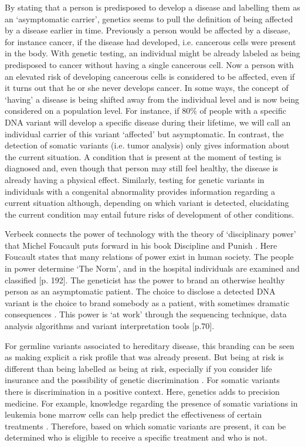 By stating that a person is predisposed to develop a disease and labelling them as an ‘asymptomatic carrier’, genetics seems to pull the definition of being affected by a disease earlier in time. 
Previously a person would be affected by a disease, for instance cancer, if the disease had developed, i.e. cancerous cells were present in the body. 
With genetic testing, an individual might be already labeled as being predisposed to cancer without having a single cancerous cell. 
Now a person with an elevated risk of developing cancerous cells is considered to be affected, even if it turns out that he or she never develops cancer. In some ways, the concept of ‘having’ a disease is being shifted away from the individual level and is now being considered on a population level. 
For instance, if 80\% of people with a specific DNA variant will develop a specific disease during their lifetime, we will call an individual carrier of this variant ‘affected’ but asymptomatic. 
In contrast, the detection of somatic variants (i.e. tumor analysis) only gives information about the current situation. 
A condition that is present at the moment of testing is diagnosed and, even though that person may still feel healthy, the disease is already having a physical effect. 
Similarly, testing for genetic variants in individuals with a congenital abnormality provides information regarding a current situation although, depending on which variant is detected, elucidating the current condition may entail future risks of development of other conditions. 

Verbeek connects the power of technology with the theory of ‘disciplinary power’ that Michel Foucault puts forward in his book Discipline and Punish \cite{Foucault_1978}. 
Here Foucault states that many relations of power exist in human society. 
The people in power determine ‘The Norm’, and in the hospital individuals are examined and classified [p. 192]. 
The geneticist has the power to brand an otherwise healthy person as an asymptomatic patient. 
The choice to disclose a detected DNA variant is the choice to brand somebody as a patient, with sometimes dramatic consequences \cite{Fulda_2006}. 
This power is ‘at work’ through the sequencing technique, data analysis algorithms and variant interpretation tools \cite{Verbeek_2011}[p.70]. 

For germline variants associated to hereditary disease, this branding can be seen as making explicit a risk profile that was already present. 
But being at risk is different than being labelled as being at risk, especially if you consider life insurance and the possibility of genetic discrimination \cite{Dalpe_2017,erfelijkheid.nl_nd}. 
For somatic variants there is discrimination in a positive context. Here, genetics adds to precision medicine. For example, knowledge regarding the presence of somatic variations in leukemia bone marrow cells can help predict the effectiveness of certain treatments \cite{Motyckova_2010,Marum_2016,Winters_2017,Baccarani_2013}. 
Therefore, based on which somatic variants are present, it can be determined who is eligible to receive a specific treatment and who is not.

